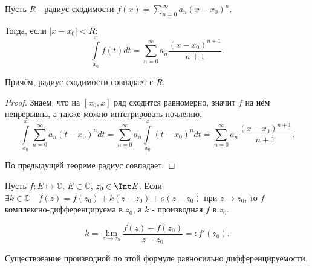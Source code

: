 \begin{theorem} \thmslashn

    Пусть $R$ - радиус сходимости $f(x) = \sum\limits_{n=0}^{\infty} a_{n}(x-x_0)^{n}$.

    Тогда, если $|x-x_0| < R$:
    \[  \int\limits_{x_0}^{x} f(t)dt = \sum\limits_{n=0}^{\infty} a_{n} \frac{(x-x_0)^{n+1}}{n+1}  .\]

    Причём, радиус сходимости совпадает с $R$.
    \begin{proof} \thmslashn
    
        Знаем, что на $[x_0, x]$ ряд сходится равномерно, значит $f$ на нём непрерывна, а также можно интегрировать почленно.
        \[ \int\limits_{x_0}^{x} \sum\limits_{n=0}^{\infty} a_{n}(t-x_0)^{n}dt = \sum\limits_{n=0}^{\infty} a_{n}\int\limits_{x_0}^{x} (t-x_0)^{n}dt = \sum\limits_{n=0}^{\infty} a_{n}\frac{(x-x_0)^{n+1}}{n+1}   .\]

        По предыдущей теореме радиус совпадает.
    \end{proof}
\end{theorem}
\begin{definition} \thmslashn 

    Пусть $f : E \mapsto \mathbb{C}$, $E \subset \mathbb{C}$, $z_0\in \Int E$. Если $\exists{k\in \mathbb{C}}\quad f(z) = f(z_0) + k(z-z_0) + o(z-z_0)$ при $z \to z_0$, то $f$ комплексно-дифференцируема в $z_0$, а $k$ - производная  $f$ в  $z_0$.
\end{definition}
\begin{remark} \thmslashn

    \[ k = \lim\limits_{z \to z_0} \frac{f(z) - f(z_0)}{z-z_0} =: f'(z_0) .\]

    Существование производной по этой формуле равносильно дифференцируемости.
\end{remark}
